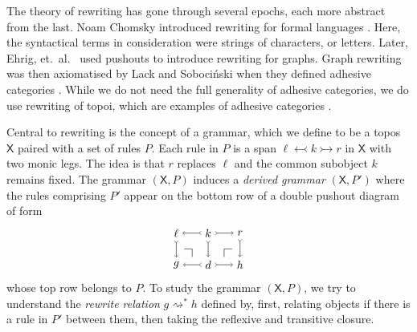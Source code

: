 \documentclass{amsart}
\newcommand{\X}{\cat{X}}
\newcommand{\cat}[1]{\mathsf{#1}}
\newcommand{\monicto}{\rightarrowtail}
\newcommand{\deriv}[2]{#1 \rightsquigarrow^\ast #2}
\newcommand{\monicgets}{\leftarrowtail}
\theoremstyle{remark}
\theoremstyle{definition}
\begin{document}
The theory of rewriting has gone through several epochs,
each more abstract from the last.  Noam Chomsky introduced rewriting for formal languages \cite{Chomsky}. Here, the
syntactical terms in consideration were strings of
characters, or letters.  Later, Ehrig,
et.\ al.\ \cite{Ehrig_GraphGram} used pushouts to introduce
rewriting for graphs.  Graph rewriting was then axiomatised
by Lack and Soboci\'{n}ski when they defined adhesive
categories \cite{LackSobo_Adhesive}.  While we do not need
the full generality of adhesive categories, we do use
rewriting of topoi, which are examples of adhesive
categories \cite{LackSobo_ToposIsAdh}.

Central to rewriting is the concept of a grammar, which we
define to be a topos $ \X $ paired with a set of rules
$ P $.  Each rule in $ P $ is a span
$ \ell \monicgets k \monicto r $ in $ \X $ with two monic
legs.  The idea is that $ r $ replaces $ \ell $ and the common subobject $ k $ remains fixed.  The
grammar $ ( \X , P ) $ induces a \emph{derived grammar}
$ ( \X , P' ) $ where the rules comprising $ P' $ 
appear on the bottom row of a double pushout diagram of
form
% 
\[
  \begin{tikzpicture}
    \node (1) at (0,1) {$ \ell $};
    \node (2) at (1,1) {$ k $};
    \node (3) at (2,1) {$ r $};
    \node (4) at (0,0) {$ g $};
    \node (5) at (1,0) {$ d $};
    \node (6) at (2,0) {$ h $};
    \draw [>->] (2) to node [] {\scriptsize{$  $}} (1);
    \draw [>->] (2) to node [] {\scriptsize{$  $}} (3);
    \draw [>->] (5) to node [] {\scriptsize{$  $}} (4);
    \draw [>->] (5) to node [] {\scriptsize{$  $}} (6);
    \draw [>->] (1) to node [] {\scriptsize{$  $}} (4);
    \draw [>->] (2) to node [] {\scriptsize{$  $}} (5);
    \draw [>->] (3) to node [] {\scriptsize{$  $}} (6);
    \begin{scope}[shift={(0,0)}]
      \draw [-] (0.25,0.5) to node [] {} (0.5,0.5);
      \draw [-] (0.5,0.5) to node [] {} (0.5,0.25);
    \end{scope}
    \begin{scope}[shift={(1.5,0)}]
      \draw [-] (0,0.25) to (0,0.5);
      \draw [-] (0,0.5) to node [] {} (0.25,0.5);
    \end{scope}
  \end{tikzpicture}
\]
%
whose top row belongs to $ P $. To study the grammar
$ ( \X , P ) $, we try to understand the \emph{rewrite
  relation} $ \deriv{g}{h} $ defined by, first, relating
objects if there is a rule in $ P' $ between them, then
taking the reflexive and transitive closure.
\end{document}
